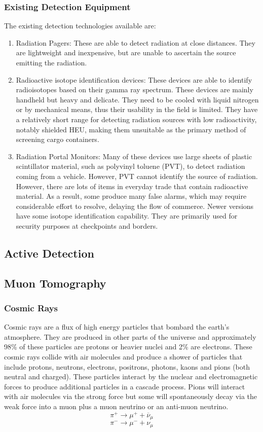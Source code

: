 \documentclass[twoside,titlepage,11pt,twocolumn,a4paper]{article}
\begin{document}
\subsubsection{Existing Detection Equipment}
The existing detection technologies available are: 
\begin{enumerate}
\item  Radiation
Pagers: These are able to detect radiation at close distances. They
are lightweight and inexpensive, but are unable to ascertain the
source emitting the radiation. \citep{medalia2007} 
\item  Radioactive
isotope identification devices: These devices are able to identify
radioisotopes based on their gamma ray spectrum. These devices are
mainly handheld but heavy and delicate. They need to be cooled with
liquid nitrogen or by mechanical means, thus their usability in the
field is limited. They have a relatively short range for detecting
radiation sources with low radioactivity, notably shielded HEU, making
them unsuitable as the primary method of screening cargo
containers. \citep{medalia2007} 
\item  Radiation Portal Monitors: Many of
these devices use large sheets of plastic scintillator material, such
as polyvinyl toluene (PVT), to detect radiation coming from a vehicle.
However, PVT cannot identify the source of radiation. However, there
are lots of items in everyday trade that contain radioactive
material. As a result, some produce many false alarms, which may
require considerable effort to resolve, delaying the flow of commerce.
Newer versions have some isotope identification
capability. \citep{medalia2007} They are primarily used for security
purposes at checkpoints and borders. \citep{nuclearMatDet}
\end{enumerate}

\subsection{Active Detection}

\subsection{Muon Tomography}
\subsubsection{Cosmic Rays}
Cosmic rays are a flux of high energy particles that bombard the
earth’s atmosphere. They are produced in other parts of the universe
and approximately 98\% of these particles are protons or heavier
nuclei and 2\% are electrons. These cosmic rays collide with air
molecules and produce a shower of particles that include protons,
neutrons, electrons, positrons, photons, kaons and pions (both neutral
and charged). These particles interact by the nuclear and
electromagnetic forces to produce additional particles in a cascade
process. Pions will interact with air molecules via the strong force
but some will spontaneously decay via the weak force into a muon plus
a muon neutrino or an anti-muon neutrino. \citep{muonManual2005}
\[ \pi^+ \rightarrow \mu^+ + \overline{\nu}_\mu \]
\[ \pi^- \rightarrow \mu^- + \nu_\mu \]
\end{document}
